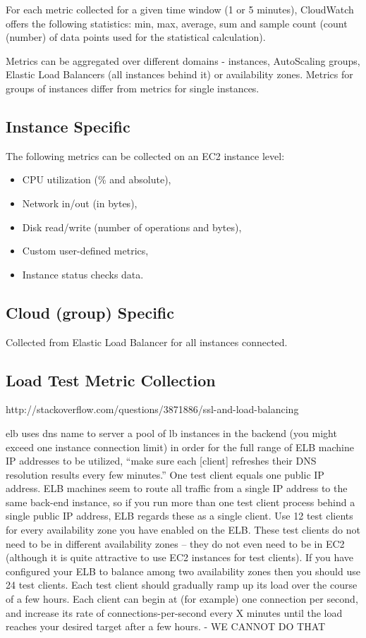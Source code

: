 \documentclass{uvamscse}
\begin{document}
For each metric collected for a given time window (1 or 5 minutes), CloudWatch offers the following statistics: min, max, average, sum and sample count (count (number) of data points used for the statistical calculation).

Metrics can be aggregated over different domains - instances, AutoScaling groups, Elastic Load Balancers (all instances behind it) or availability zones. Metrics for groups of instances differ from metrics for single instances.

\subsection{Instance Specific}
The following metrics can be collected on an EC2 instance level:
\begin{itemize}
  \item CPU utilization (\% and absolute),
  \item Network in/out (in bytes),
  \item Disk read/write (number of operations and bytes),
  \item Custom user-defined metrics,
  \item Instance status checks data.
\end{itemize}

\subsection{Cloud (group) Specific}
Collected from Elastic Load Balancer for all instances connected.

\subsection{Load Test Metric Collection}
http://stackoverflow.com/questions/3871886/ssl-and-load-balancing

elb uses dns name to server a pool of lb instances in the backend (you might exceed one instance connection limit)
in order for the full range of ELB machine IP addresses to be utilized, “make sure each [client] refreshes their DNS resolution results every few minutes.”
One test client equals one public IP address. ELB machines seem to route all traffic from a single IP address to the same back-end instance, so if you run more than one test client process behind a single public IP address, ELB regards these as a single client.
Use 12 test clients for every availability zone you have enabled on the ELB. These test clients do not need to be in different availability zones – they do not even need to be in EC2 (although it is quite attractive to use EC2 instances for test clients). If you have configured your ELB to balance among two availability zones then you should use 24 test clients.
Each test client should gradually ramp up its load over the course of a few hours. Each client can begin at (for example) one connection per second, and increase its rate of connections-per-second every X minutes until the load reaches your desired target after a few hours. - WE CANNOT DO THAT
\end{document}
